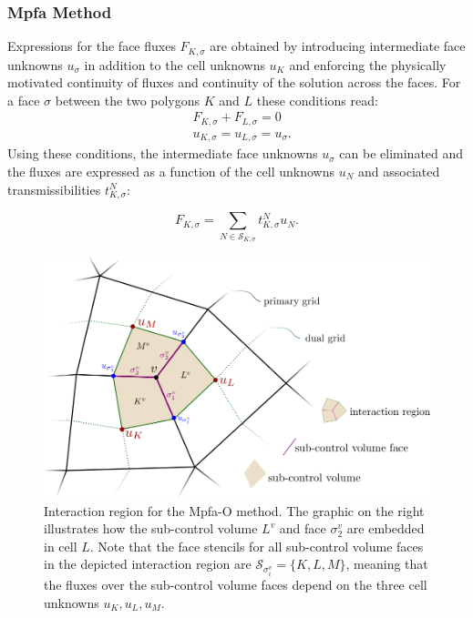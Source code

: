 \subsubsection{Mpfa Method}\label{cc_mpfa}
Expressions for the face fluxes $F_{K, \sigma}$ are obtained by introducing intermediate face unknowns $u_\sigma$ in addition to the cell unknowns $u_K$ and enforcing the physically motivated continuity of fluxes and continuity of the solution across the faces. For a face $\sigma$ between the two polygons $K$ and $L$ these conditions read:
\begin{equation}
    \begin{aligned}
        &F_{K, \sigma} + F_{L, \sigma} = 0 \\
        &{u}_{K,\sigma} = {u}_{L,\sigma} = {u}_{\sigma}.
        \label{eq:sigmaConditions}
    \end{aligned}
\end{equation}
Using these conditions, the intermediate face unknowns ${u}_\sigma$ can be eliminated and the fluxes are expressed as a function of the cell unknowns $u_N$ and associated transmissibilities $t^N_{K,\sigma}$:

\begin{equation}
    F_{K,\sigma} = \sum_{N \in \mathcal{S}_{K,\sigma}} t^N_{K,\sigma} u_{N}.
    \label{eq:FVFluxExpression}
\end{equation}

\begin{figure} [ht]
\centering
\includegraphics[width=0.8\linewidth,keepaspectratio]{PNG/mpfa_iv.png}
\caption{Interaction region for the Mpfa-O method. The graphic on the right illustrates how the sub-control volume $L^v$ and face $\sigma^v_2$ are embedded in cell $L$. Note that the face stencils for all sub-control volume faces in the depicted interaction region are $\mathcal{S}_{\sigma^v_i} = \{ K,L,M \}$, meaning that the fluxes over the sub-control volume faces depend on the three cell unknowns $u_K, u_L, u_M$.}
\label{pc:interactionRegion_mpfa}
\end{figure}

